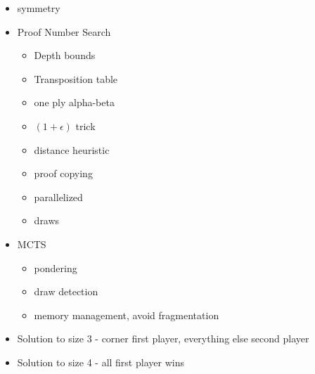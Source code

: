 \begin{itemize}
\item symmetry
\item Proof Number Search
	\begin{itemize}
		\item Depth bounds
		\item Transposition table
		\item one ply alpha-beta
		\item $(1+\epsilon)$ trick
		\item distance heuristic
		\item proof copying
		\item parallelized
		\item draws
	\end{itemize}

\item MCTS
	\begin{itemize}
		\item pondering
		\item draw detection
		\item memory management, avoid fragmentation
	\end{itemize}

\item Solution to size 3 - corner first player, everything else second player
\item Solution to size 4 - all first player wins


\end{itemize}

